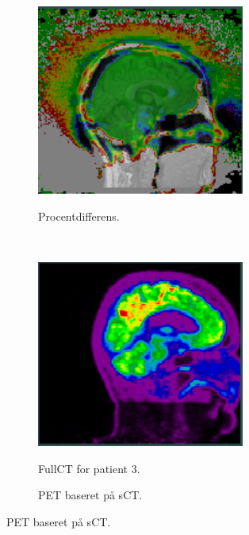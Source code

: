 \begin{figure}
\begin{subfigure}[b]{0.3\textwidth}
        \label{col:loocv_pet_pat2_sct}
    \end{subfigure}\hfill
    \begin{subfigure}[b]{0.3\textwidth}
        \caption{Procentdifferens.}
        \includegraphics[width=0.75\textwidth]{colager/loocv_pet/loocv_010769_pet_pd.png}
        \label{col:loocv_pet_pat2_sub}
    \end{subfigure}\\
    \begin{subfigure}[b]{0.3\textwidth}
        \caption{FullCT for patient 3.}
        \includegraphics[width=0.75\textwidth]{colager/loocv_pet/loocv_010850_pet_ct.png}
        \label{col:loocv_pet_pat3_ct}
    \end{subfigure}\hfill
    \begin{subfigure}[b]{0.3\textwidth}
        \caption{PET baseret på sCT.}

\end{subfigure}
\end{figure}
